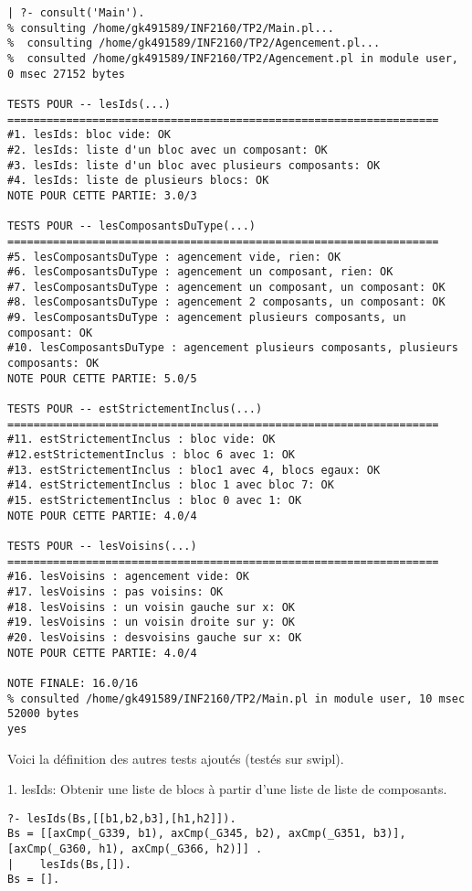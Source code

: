 \documentclass[letterpaper,11pt]{letter}
\begin{document}
\begin{verbatim}
| ?- consult('Main').
% consulting /home/gk491589/INF2160/TP2/Main.pl...
%  consulting /home/gk491589/INF2160/TP2/Agencement.pl...
%  consulted /home/gk491589/INF2160/TP2/Agencement.pl in module user, 0 msec 27152 bytes

TESTS POUR -- lesIds(...)
==================================================================
#1. lesIds: bloc vide: OK
#2. lesIds: liste d'un bloc avec un composant: OK
#3. lesIds: liste d'un bloc avec plusieurs composants: OK
#4. lesIds: liste de plusieurs blocs: OK
NOTE POUR CETTE PARTIE: 3.0/3

TESTS POUR -- lesComposantsDuType(...)
==================================================================
#5. lesComposantsDuType : agencement vide, rien: OK
#6. lesComposantsDuType : agencement un composant, rien: OK
#7. lesComposantsDuType : agencement un composant, un composant: OK
#8. lesComposantsDuType : agencement 2 composants, un composant: OK
#9. lesComposantsDuType : agencement plusieurs composants, un composant: OK
#10. lesComposantsDuType : agencement plusieurs composants, plusieurs composants: OK
NOTE POUR CETTE PARTIE: 5.0/5

TESTS POUR -- estStrictementInclus(...)
==================================================================
#11. estStrictementInclus : bloc vide: OK
#12.estStrictementInclus : bloc 6 avec 1: OK
#13. estStrictementInclus : bloc1 avec 4, blocs egaux: OK
#14. estStrictementInclus : bloc 1 avec bloc 7: OK
#15. estStrictementInclus : bloc 0 avec 1: OK
NOTE POUR CETTE PARTIE: 4.0/4

TESTS POUR -- lesVoisins(...)
==================================================================
#16. lesVoisins : agencement vide: OK
#17. lesVoisins : pas voisins: OK
#18. lesVoisins : un voisin gauche sur x: OK
#19. lesVoisins : un voisin droite sur y: OK
#20. lesVoisins : desvoisins gauche sur x: OK
NOTE POUR CETTE PARTIE: 4.0/4

NOTE FINALE: 16.0/16
% consulted /home/gk491589/INF2160/TP2/Main.pl in module user, 10 msec 52000 bytes
yes
\end{verbatim}

Voici la définition des autres tests ajoutés (testés sur swipl).

1. lesIds: Obtenir une liste de blocs à partir d'une liste de liste de composants.
\begin{verbatim}
?- lesIds(Bs,[[b1,b2,b3],[h1,h2]]).
Bs = [[axCmp(_G339, b1), axCmp(_G345, b2), axCmp(_G351, b3)], [axCmp(_G360, h1), axCmp(_G366, h2)]] .
|    lesIds(Bs,[]).
Bs = [].
\end{verbatim}
\end{document}
